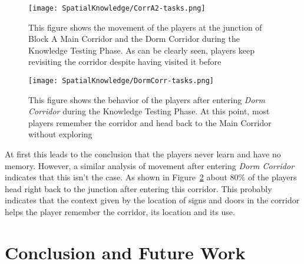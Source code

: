 \begin{figure}[!tb]
    \begin{center}
        \texttt{[image: SpatialKnowledge/CorrA2-tasks.png]}
    \end{center}
    \caption[Player behavior at junction under consideration]{This figure shows the movement of the players at the junction of Block A Main Corridor and the Dorm Corridor  during the Knowledge Testing Phase. As can be clearly seen, players keep revisiting the corridor despite having visited it before}
    \label{fig:junctionA2Behavior}
\end{figure}
\begin{figure}[!tb]
    \begin{center}
        \texttt{[image: SpatialKnowledge/DormCorr-tasks.png]}
    \end{center}
    \caption[Player behavior at dorm corridor]{This figure shows the behavior of the players after entering \emph{Dorm Corridor} during  the Knowledge Testing Phase. At this point, most players remember the corridor and head back to the Main Corridor without exploring}
    \label{fig:dormCorrBehavior}
\end{figure}

At first this leads to the conclusion that the players never learn and have no memory. However, a similar analysis of movement after entering \emph{Dorm Corridor} indicates that this isn't the case. As shown in Figure~\ref{fig:dormCorrBehavior} about $80\%$ of the players head right back to the junction after entering this corridor. This probably indicates that the context given by the location of signs and doors in the corridor helps the player remember the corridor, its location and its use.






\section{Conclusion and Future Work} %
\label{sec:conclusion}

